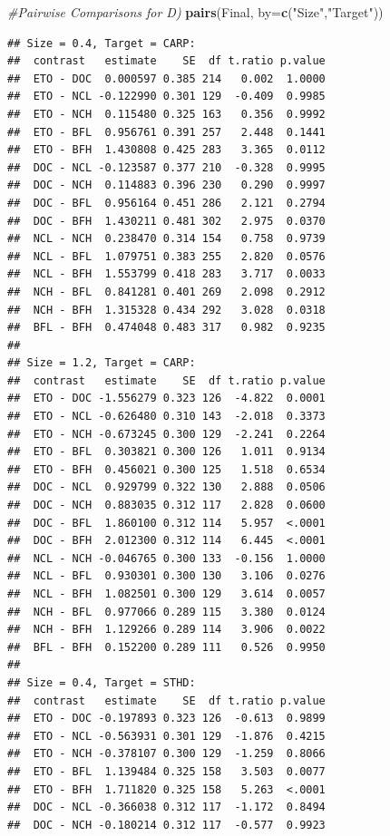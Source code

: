 \documentclass[
]{article}
\newenvironment{Shaded}{\begin{snugshade}}{\end{snugshade}}
\newcommand{\AttributeTok}[1]{\textcolor[rgb]{0.13,0.29,0.53}{#1}}
\newcommand{\CommentTok}[1]{\textcolor[rgb]{0.56,0.35,0.01}{\textit{#1}}}
\newcommand{\FunctionTok}[1]{\textcolor[rgb]{0.13,0.29,0.53}{\textbf{#1}}}
\newcommand{\NormalTok}[1]{#1}
\newcommand{\StringTok}[1]{\textcolor[rgb]{0.31,0.60,0.02}{#1}}
\begin{document}
\begin{Shaded}
\begin{Highlighting}[]
\CommentTok{\#Pairwise Comparisons for D)}
\FunctionTok{pairs}\NormalTok{(Final, }\AttributeTok{by=}\FunctionTok{c}\NormalTok{(}\StringTok{"Size"}\NormalTok{,}\StringTok{"Target"}\NormalTok{))}
\end{Highlighting}
\end{Shaded}

\begin{verbatim}
## Size = 0.4, Target = CARP:
##  contrast   estimate    SE  df t.ratio p.value
##  ETO - DOC  0.000597 0.385 214   0.002  1.0000
##  ETO - NCL -0.122990 0.301 129  -0.409  0.9985
##  ETO - NCH  0.115480 0.325 163   0.356  0.9992
##  ETO - BFL  0.956761 0.391 257   2.448  0.1441
##  ETO - BFH  1.430808 0.425 283   3.365  0.0112
##  DOC - NCL -0.123587 0.377 210  -0.328  0.9995
##  DOC - NCH  0.114883 0.396 230   0.290  0.9997
##  DOC - BFL  0.956164 0.451 286   2.121  0.2794
##  DOC - BFH  1.430211 0.481 302   2.975  0.0370
##  NCL - NCH  0.238470 0.314 154   0.758  0.9739
##  NCL - BFL  1.079751 0.383 255   2.820  0.0576
##  NCL - BFH  1.553799 0.418 283   3.717  0.0033
##  NCH - BFL  0.841281 0.401 269   2.098  0.2912
##  NCH - BFH  1.315328 0.434 292   3.028  0.0318
##  BFL - BFH  0.474048 0.483 317   0.982  0.9235
## 
## Size = 1.2, Target = CARP:
##  contrast   estimate    SE  df t.ratio p.value
##  ETO - DOC -1.556279 0.323 126  -4.822  0.0001
##  ETO - NCL -0.626480 0.310 143  -2.018  0.3373
##  ETO - NCH -0.673245 0.300 129  -2.241  0.2264
##  ETO - BFL  0.303821 0.300 126   1.011  0.9134
##  ETO - BFH  0.456021 0.300 125   1.518  0.6534
##  DOC - NCL  0.929799 0.322 130   2.888  0.0506
##  DOC - NCH  0.883035 0.312 117   2.828  0.0600
##  DOC - BFL  1.860100 0.312 114   5.957  <.0001
##  DOC - BFH  2.012300 0.312 114   6.445  <.0001
##  NCL - NCH -0.046765 0.300 133  -0.156  1.0000
##  NCL - BFL  0.930301 0.300 130   3.106  0.0276
##  NCL - BFH  1.082501 0.300 129   3.614  0.0057
##  NCH - BFL  0.977066 0.289 115   3.380  0.0124
##  NCH - BFH  1.129266 0.289 114   3.906  0.0022
##  BFL - BFH  0.152200 0.289 111   0.526  0.9950
## 
## Size = 0.4, Target = STHD:
##  contrast   estimate    SE  df t.ratio p.value
##  ETO - DOC -0.197893 0.323 126  -0.613  0.9899
##  ETO - NCL -0.563931 0.301 129  -1.876  0.4215
##  ETO - NCH -0.378107 0.300 129  -1.259  0.8066
##  ETO - BFL  1.139484 0.325 158   3.503  0.0077
##  ETO - BFH  1.711820 0.325 158   5.263  <.0001
##  DOC - NCL -0.366038 0.312 117  -1.172  0.8494
##  DOC - NCH -0.180214 0.312 117  -0.577  0.9923

\end{verbatim}
\end{document}
